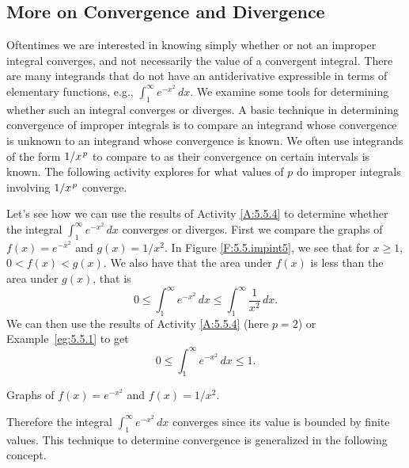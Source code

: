 

\subsection*{More on Convergence and Divergence} 

Oftentimes we are interested in knowing simply whether or not an improper integral converges, and not necessarily the value of a convergent integral. There are many integrands that do not have an antiderivative expressible in terms of elementary functions, e.g., $\int_1^{\infty} e^{-x^2} \, dx$. We examine some tools for determining whether such an integral converges or diverges. 
A basic technique in determining convergence of improper integrals is to compare an integrand whose convergence is unknown to an integrand whose convergence is known. We often use integrands of the form $1/x\hskip1pt ^p$ to compare to as their convergence on certain intervals is known. The following activity explores for what values of $p$ do improper integrals involving $1/x\hskip1pt ^p$ converge. 


Let's see how we can use the results of Activity \ref{A:5.5.4} to determine whether the integral $\int_1^{\infty} e^{-x^2} \, dx$ converges or diverges. First we compare the graphs of $f(x) = e^{-x^2}$ and $g(x)=1/x^2$. In Figure \ref{F:5.5.impint5}, we see that for $x\geq 1$, $0< f(x) < g(x)$.  We also have that the area under $f(x)$ is less than the area under $g(x)$, that is 
$$0 \leq \int_1^{\infty} e^{-x^2} \, dx \leq \int_1^{\infty} \frac1{x^2} \, dx.$$
We can then use the results of Activity \ref{A:5.5.4} (here $p=2$) or Example~\ref{eg:5.5.1} to get 
$$ 0 \leq \int_1^{\infty} e^{-x^2} \, dx \leq 1.$$

\begin{marginfigure} %
\caption{Graphs of $f(x) = e^{-x^2}$ and $f(x)= 1/x^2$.}
\label{F:5.5.impint5}
\end{marginfigure}

Therefore the integral $\int_1^{\infty} e^{-x^2} \, dx$ converges since its value is bounded by finite values. This technique to determine convergence is generalized in the following concept. 

